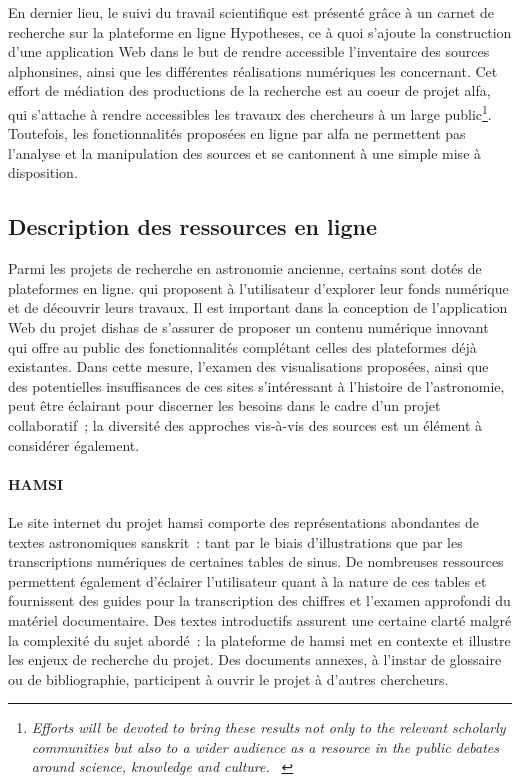 \documentclass[a4paper,12pt,twoside]{book}
\newcommand{\eng}{\emph}
\newcommand{\g}[1]{\og#1~\fg}
\newcommand{\dishas}{\gls{dishas}\xspace}
\newcommand{\alfa}{\gls{alfa}\xspace}
\newcommand{\hamsi}{\gls{hamsi}\xspace}
\begin{document}
En dernier lieu, le suivi du travail scientifique est présenté grâce à un carnet de recherche sur la plateforme en ligne Hypotheses, ce à quoi s'ajoute la construction d'une application Web dans le but de rendre accessible l'inventaire des sources alphonsines, ainsi que les différentes réalisations numériques les concernant. Cet effort de médiation des productions de la recherche est au coeur de projet \alfa, qui s'attache à rendre accessibles les travaux des chercheurs à un large public\footnote{\g{\eng{Efforts will be devoted to bring these results not only to the relevant scholarly communities but also to a wider audience as a resource in the public debates around science, knowledge and culture.}} \cite{ShapingEuropeanScientific}}. Toutefois, les fonctionnalités proposées en ligne par \alfa ne permettent pas l'analyse et la manipulation des sources et se cantonnent à une simple mise à disposition.

		\subsection{Description des ressources en ligne}
Parmi les projets de recherche en astronomie ancienne, certains sont dotés de plateformes en ligne. qui proposent à l'utilisateur d'explorer leur fonds numérique et de découvrir leurs travaux. Il est important dans la conception de l'application Web du projet \dishas de s'assurer de proposer un contenu numérique innovant qui offre au public des fonctionnalités complétant celles des plateformes déjà existantes. Dans cette mesure, l'examen des visualisations proposées, ainsi que des potentielles insuffisances de ces sites s'intéressant à l'histoire de l'astronomie, peut être éclairant pour discerner les besoins dans le cadre d'un projet collaboratif~; la diversité des approches vis-à-vis des sources est un élément à considérer également. 

				\paragraph{HAMSI}
Le site internet du projet \hamsi comporte des représentations abondantes de textes astronomiques sanskrit~: tant par le biais d'illustrations que par les transcriptions numériques de certaines tables de sinus. De nombreuses ressources permettent également d'éclairer l'utilisateur quant à la nature de ces tables et fournissent des guides pour la transcription des chiffres et l'examen approfondi du matériel documentaire. Des textes introductifs assurent une certaine clarté malgré la complexité du sujet abordé~: la plateforme de \hamsi met en contexte et illustre les enjeux de recherche du projet. Des documents annexes, à l'instar de glossaire ou de bibliographie, participent à ouvrir le projet à d'autres chercheurs.
\end{document}

